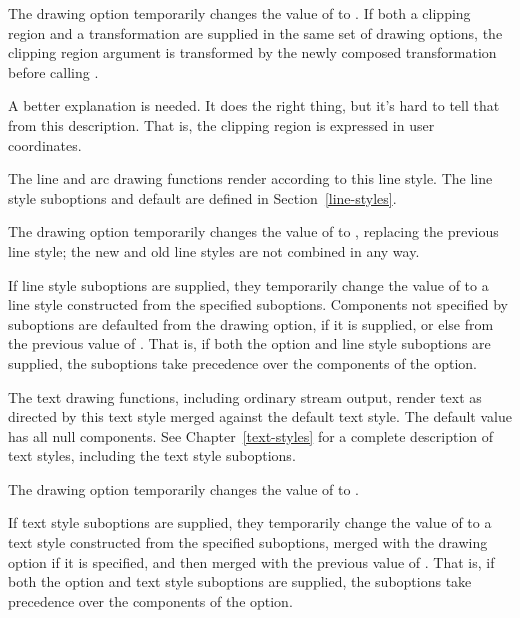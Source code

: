 The   drawing option temporarily changes the
value of  to .  If both a clipping region and a
transformation are supplied in the same set of drawing options, the clipping
region argument is transformed by the newly composed transformation before
calling .

 {A better explanation is needed.  It does the right thing, but
it's hard to tell that from this description.  That is, the clipping region is
expressed in user coordinates.}



The line and arc drawing functions render according to this line style.  The
line style suboptions and default are defined in Section~\ref{line-styles}.

The   drawing option temporarily changes the value of
 to , replacing the previous line
style; the new and old line styles are not combined in any way.

If line style suboptions are supplied, they temporarily change the value of
 to a line style constructed from the
specified suboptions.  Components not specified by suboptions are defaulted from
the  drawing option, if it is supplied, or else from the
previous value of .  That is, if both the
 option and line style suboptions are supplied, the suboptions
take precedence over the components of the  option.



The text drawing functions, including ordinary stream output, render text as
directed by this text style merged against the default text style.  The default
value has all null components.  See Chapter~\ref{text-styles} for a complete
description of text styles, including the text style suboptions.

The   drawing option temporarily changes the value of
 to .

If text style suboptions are supplied, they temporarily change the value of
 to a text style constructed from the
specified suboptions, merged with the  drawing option if it is
specified, and then merged with the previous value of .  That is, if both the  option and text style
suboptions are supplied, the suboptions take precedence over the components of
the  option.


